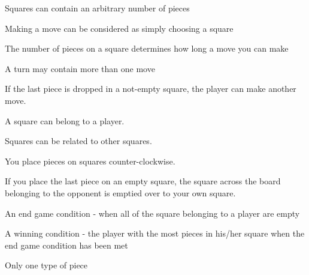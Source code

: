 \begin{dlist}
	\item Squares can contain an arbitrary number of pieces
	\item Making a move can be considered as simply choosing a square
	\item The number of pieces on a square determines how long a move you can make
	\item A turn may contain more than one move
		\begin{dlist}
			\item If the last piece is dropped in a not-empty square, the player can make another move.
		\end{dlist}
	\item A square can belong to a player.
	\item Squares can be related to other squares.
		\begin{dlist}
			\item You place pieces on squares counter-clockwise.
			\item If you place the last piece on an empty square, the square across the board belonging to the opponent is emptied over to your own square.
		\end{dlist}
	\item An end game condition - when all of the square belonging to a player are empty
	\item A winning condition - the player with the most pieces in his/her square when the end game condition has been met
	\item Only one type of piece
\end{dlist}


